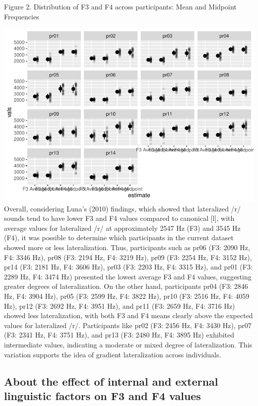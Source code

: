 \documentclass[
  man]{apa6}
\begin{document}
Figure 2.
Distribution of F3 and F4 across participants: Mean and Midpoint Frequencies

\includegraphics{paper_files/figure-latex/unnamed-chunk-5-1.pdf}
Overall, considering Luna's (2010) findings, which showed that lateralized /r/ sounds tend to have lower F3 and F4 values compared to canonical {[}l{]}, with average values for lateralized /r/ at approximately 2547 Hz (F3) and 3545 Hz (F4), it was possible to determine which participants in the current dataset showed more or less lateralization. Thus, participants such as pr06 (F3: 2090 Hz, F4: 3346 Hz), pr08 (F3: 2194 Hz, F4: 3219 Hz), pr09 (F3: 2254 Hz, F4: 3152 Hz), pr14 (F3: 2181 Hz, F4: 3606 Hz), pr03 (F3: 2203 Hz, F4: 3315 Hz), and pr01 (F3: 2289 Hz, F4: 3474 Hz) presented the lowest average F3 and F4 values, suggesting greater degrees of lateralization. On the other hand, participants pr04 (F3: 2846 Hz, F4: 3904 Hz), pr05 (F3: 2599 Hz, F4: 3822 Hz), pr10 (F3: 2516 Hz, F4: 4059 Hz), pr12 (F3: 2692 Hz, F4: 3951 Hz), and pr11 (F3: 2659 Hz, F4: 3716 Hz) showed less lateralization, with both F3 and F4 means clearly above the expected values for lateralized /r/. Participants like pr02 (F3: 2456 Hz, F4: 3430 Hz), pr07 (F3: 2341 Hz, F4: 3751 Hz), and pr13 (F3: 2480 Hz, F4: 3895 Hz) exhibited intermediate values, indicating a moderate or mixed degree of lateralization. This variation supports the idea of gradient lateralization across individuals.

\subsection{About the effect of internal and external linguistic factors on F3 and F4 values}\label{about-the-effect-of-internal-and-external-linguistic-factors-on-f3-and-f4-values}
\end{document}
